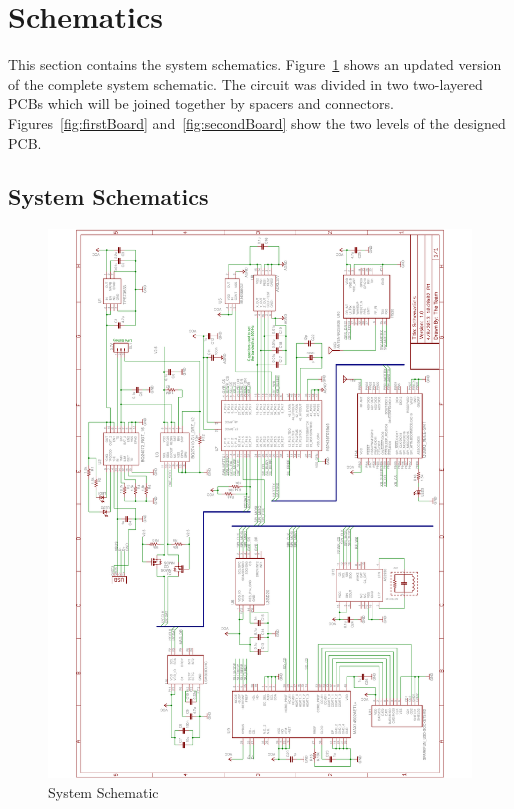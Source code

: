 \section{Schematics}

This section contains the system schematics. Figure~\ref{fig:systemSchematics} shows an updated version of the complete system schematic.  The circuit was divided in two two-layered PCBs which will be joined together by spacers and connectors. Figures~\ref{fig:firstBoard} and~\ref{fig:secondBoard} show the two levels of the designed PCB. 
\subsection{System Schematics}
\begin{figure}[H]
\centering
	\includegraphics[width=\textwidth]{img/CompleteSchematics}
	\caption{System Schematic \label{fig:systemSchematics}}
\end{figure}

